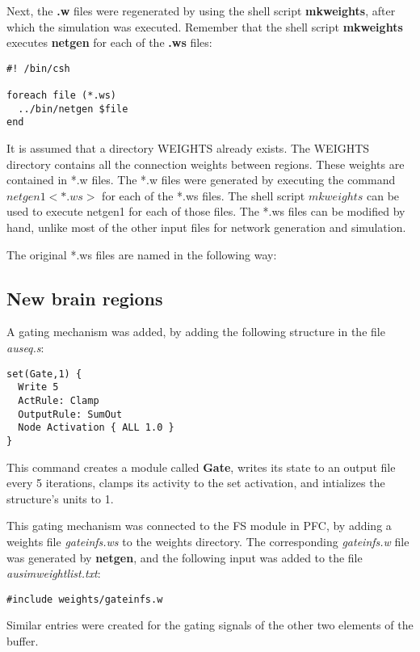 \documentclass[12pt]{article}
\begin{document}
Next, the {\bf *.w} files were regenerated by using the shell script 
{\bf mkweights}, after which the simulation was executed. Remember
that the shell script {\bf mkweights} executes {\bf netgen} for each
of the {\bf *.ws} files:
\begin{verbatim}
#! /bin/csh

foreach file (*.ws)
  ../bin/netgen $file
end
\end{verbatim}

It is assumed that a directory WEIGHTS already exists. The 
WEIGHTS directory contains all the connection weights 
between regions. These weights are contained in *.w files.
The *.w files were generated by executing the command
$netgen1 <*.ws>$
for each of the *.ws files. The shell script $mkweights$
can be used to execute netgen1 for each of those files.
The *.ws files can be modified by hand, unlike most of 
the other input files for network generation and simulation.

The original *.ws files are named in the following way:

\subsection{New brain regions}
A gating mechanism was added, by adding the following structure in the
file {\em auseq.s}:
\begin{verbatim}
set(Gate,1) {
  Write 5 
  ActRule: Clamp
  OutputRule: SumOut
  Node Activation { ALL 1.0 }
}
\end{verbatim}
This command creates a module called {\bf Gate}, writes its state to
an output file every 5 iterations, clamps its activity to the set
activation, and intializes the structure's units to 1. 

This gating mechanism was connected to the FS module in PFC, by adding
a weights file {\em gateinfs.ws} to the weights directory. The
corresponding {\em gateinfs.w} file was generated by {\bf netgen}, and
the following input was added to the file {\em ausimweightlist.txt}:
\begin{verbatim}
#include weights/gateinfs.w
\end{verbatim}
Similar entries were created for the gating signals of the other two
elements of the buffer. 

\end{document}
